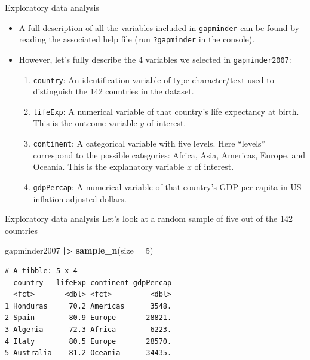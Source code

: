 \documentclass[
  ignorenonframetext,
]{beamer}
\newenvironment{Shaded}{\begin{snugshade}}{\end{snugshade}}
\newcommand{\AttributeTok}[1]{\textcolor[rgb]{0.13,0.29,0.53}{#1}}
\newcommand{\DecValTok}[1]{\textcolor[rgb]{0.00,0.00,0.81}{#1}}
\newcommand{\FunctionTok}[1]{\textcolor[rgb]{0.13,0.29,0.53}{\textbf{#1}}}
\newcommand{\NormalTok}[1]{#1}
\newcommand{\SpecialCharTok}[1]{\textcolor[rgb]{0.81,0.36,0.00}{\textbf{#1}}}
\begin{document}
\begin{frame}[fragile]{Exploratory data analysis}
\protect\hypertarget{exploratory-data-analysis-1}{}
\begin{itemize}
\item
  A full description of all the variables included in \texttt{gapminder}
  can be found by reading the associated help file (run
  \texttt{?gapminder} in the console).
\item
  However, let's fully describe the 4 variables we selected in
  \texttt{gapminder2007}:

  \begin{enumerate}
  \item
    \texttt{country}: An identification variable of type character/text
    used to distinguish the 142 countries in the dataset.
  \item
    \texttt{lifeExp}: A numerical variable of that country's life
    expectancy at birth. This is the outcome variable \(y\) of interest.
  \item
    \texttt{continent}: A categorical variable with five levels. Here
    ``levels'' correspond to the possible categories: Africa, Asia,
    Americas, Europe, and Oceania. This is the explanatory variable
    \(x\) of interest.
  \item
    \texttt{gdpPercap}: A numerical variable of that country's GDP per
    capita in US inflation-adjusted dollars.
  \end{enumerate}
\end{itemize}
\end{frame}

\begin{frame}[fragile]{Exploratory data analysis}
\protect\hypertarget{exploratory-data-analysis-2}{}
Let's look at a random sample of five out of the 142 countries

\begin{Shaded}
\begin{Highlighting}[]
\NormalTok{gapminder2007 }\SpecialCharTok{|\textgreater{}} 
  \FunctionTok{sample\_n}\NormalTok{(}\AttributeTok{size =} \DecValTok{5}\NormalTok{)}
\end{Highlighting}
\end{Shaded}

\begin{verbatim}
# A tibble: 5 x 4
  country   lifeExp continent gdpPercap
  <fct>       <dbl> <fct>         <dbl>
1 Honduras     70.2 Americas      3548.
2 Spain        80.9 Europe       28821.
3 Algeria      72.3 Africa        6223.
4 Italy        80.5 Europe       28570.
5 Australia    81.2 Oceania      34435.
\end{verbatim}
\end{frame}
\end{document}
